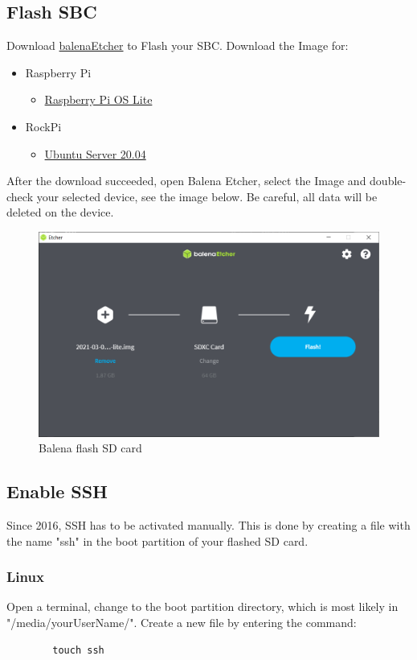 \documentclass[a4paper,12pt]{article}
\begin{document}
	\subsection{Flash SBC}
	Download \href{https://www.balena.io/etcher/}{balenaEtcher} to Flash your SBC.
	Download the Image for:
	\begin{itemize}
		\item Raspberry Pi
		\begin{itemize}
			\item \href{https://www.raspberrypi.org/software/operating-systems/}{Raspberry Pi OS Lite}
		\end{itemize}
		\item RockPi 
		\begin{itemize}
			\item \href{https://wiki.radxa.com/Rockpi4/downloads}{Ubuntu Server 20.04}
		\end{itemize}
	\end{itemize}
	After the download succeeded, open Balena Etcher, select the Image and double-check your selected device, see the image below. Be careful, all data will be deleted on the device.
	\begin{figure}[H]
		\centering
		\includegraphics{images/BalenaEtcherFlash.png}
		\caption{Balena flash SD card}
	\end{figure}
	\subsection{Enable SSH}
	Since 2016, SSH has to be activated manually. This is done by creating a file with the name "ssh" in the boot partition of your flashed SD card.
	\subsubsection{Linux}
	Open a terminal, change to the boot partition directory, which is most likely in "/media/yourUserName/".
	Create a new file by entering the command:
	\begin{verbatim}
		touch ssh
	\end{verbatim}
\end{document}
